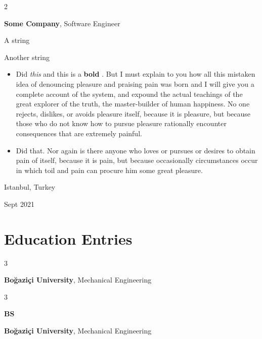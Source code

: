 \documentclass[10pt, letterpaper]{article}
\newenvironment{summary}{
    \begin{description}[
        topsep=0.10 cm,
        parsep=0.10 cm,
        partopsep=0pt,
        itemsep=0pt,
        leftmargin=0.4 cm + 10pt
    ]
}{
    \end{description}
} %
\newenvironment{highlights}{
    \begin{itemize}[
        topsep=0.10 cm,
        parsep=0.10 cm,
        partopsep=0pt,
        itemsep=0pt,
        leftmargin=0.4 cm + 10pt
    ]
}{
    \end{itemize}
} %
\newenvironment{twocolentry}[2][]{
    \onecolentry
    \def\secondColumn{#2}
    \setcolumnwidth{\fill, 4.5 cm}
    \begin{paracol}{2}
}{
    \switchcolumn \raggedleft \secondColumn
    \end{paracol}
    \endonecolentry
} %
\newenvironment{threecolentry}[3][]{
    \onecolentry
    \def\thirdColumn{#3}
    \setcolumnwidth{1 cm, \fill, 4.5 cm}
    \begin{paracol}{3}
    {\raggedright #2} \switchcolumn
}{
    \switchcolumn \raggedleft \thirdColumn
    \end{paracol}
    \endonecolentry
} %
\let\hrefWithoutArrow\href
\renewcommand{\href}[2]{\hrefWithoutArrow{#1}{\ifthenelse{\equal{#2}{}}{ }{#2 }\raisebox{.15ex}{\footnotesize \faExternalLink*}}}
\begin{document}
        \begin{twocolentry}{
            Istanbul, Turkey

        Sept 2021
        }
            \textbf{Some \textnormal{Company}}, Software Engineer
            \begin{summary}
                \item A string
                \item Another string
            \end{summary}
            \begin{highlights}
                \item Did \textit{this} and this is a \textbf{bold} \href{https://example.com}{link}. But I must explain to you how all this mistaken idea of denouncing pleasure and praising pain was born and I will give you a complete account of the system, and expound the actual teachings of the great explorer of the truth, the master-builder of human happiness. No one rejects, dislikes, or avoids pleasure itself, because it is pleasure, but because those who do not know how to pursue pleasure rationally encounter consequences that are extremely painful.
                \item Did that. Nor again is there anyone who loves or pursues or desires to obtain pain of itself, because it is pain, but because occasionally circumstances occur in which toil and pain can procure him some great pleasure.
            \end{highlights}
        \end{twocolentry}



    
    \section{Education Entries}



        
        \begin{threecolentry}{\textbf{}}{
            
        }
            \textbf{Boğaziçi University}, Mechanical Engineering
        \end{threecolentry}

        \vspace{0.2 cm}

        \begin{threecolentry}{\textbf{BS}}{
            
        }
            \textbf{Boğaziçi University}, Mechanical Engineering
        \end{threecolentry}
\end{document}
